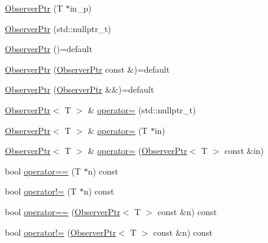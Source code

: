 \begin{DoxyCompactItemize}
\item 
\hyperlink{structvt_1_1util_1_1ptr_1_1_observer_ptr_a6130f8e36c57c992ab5fc8ce954f921b}{Observer\+Ptr} (T $\ast$in\+\_\+p)
\item 
\hyperlink{structvt_1_1util_1_1ptr_1_1_observer_ptr_afa392aae4efef6c10eb8372b19de5008}{Observer\+Ptr} (std\+::nullptr\+\_\+t)
\item 
\hyperlink{structvt_1_1util_1_1ptr_1_1_observer_ptr_a1dfb004e6df35f93847876bdafac2f3b}{Observer\+Ptr} ()=default
\item 
\hyperlink{structvt_1_1util_1_1ptr_1_1_observer_ptr_ac156b77e1a813a2cb9d5d32578dba8ac}{Observer\+Ptr} (\hyperlink{structvt_1_1util_1_1ptr_1_1_observer_ptr}{Observer\+Ptr} const \&)=default
\item 
\hyperlink{structvt_1_1util_1_1ptr_1_1_observer_ptr_abbd144c94f936c6b027508e316270edc}{Observer\+Ptr} (\hyperlink{structvt_1_1util_1_1ptr_1_1_observer_ptr}{Observer\+Ptr} \&\&)=default
\item 
\hyperlink{structvt_1_1util_1_1ptr_1_1_observer_ptr}{Observer\+Ptr}$<$ T $>$ \& \hyperlink{structvt_1_1util_1_1ptr_1_1_observer_ptr_a1e4b2d8b7fa49ddbba59b5d2516b0317}{operator=} (std\+::nullptr\+\_\+t)
\item 
\hyperlink{structvt_1_1util_1_1ptr_1_1_observer_ptr}{Observer\+Ptr}$<$ T $>$ \& \hyperlink{structvt_1_1util_1_1ptr_1_1_observer_ptr_a8134934d20910965a81a9dd65b40ed5a}{operator=} (T $\ast$in)
\item 
\hyperlink{structvt_1_1util_1_1ptr_1_1_observer_ptr}{Observer\+Ptr}$<$ T $>$ \& \hyperlink{structvt_1_1util_1_1ptr_1_1_observer_ptr_ad1095edbab8585f49c0845914e3d2921}{operator=} (\hyperlink{structvt_1_1util_1_1ptr_1_1_observer_ptr}{Observer\+Ptr}$<$ T $>$ const \&in)
\item 
bool \hyperlink{structvt_1_1util_1_1ptr_1_1_observer_ptr_ae7af50331ac75272eee6f6f1d41c01db}{operator==} (T $\ast$n) const
\item 
bool \hyperlink{structvt_1_1util_1_1ptr_1_1_observer_ptr_aeb5dc64d64f5ebd920bfeaa094fa9647}{operator!=} (T $\ast$n) const
\item 
bool \hyperlink{structvt_1_1util_1_1ptr_1_1_observer_ptr_a7b4eb7de1198d4082f5aaaab043ac5d1}{operator==} (\hyperlink{structvt_1_1util_1_1ptr_1_1_observer_ptr}{Observer\+Ptr}$<$ T $>$ const \&n) const
\item 
bool \hyperlink{structvt_1_1util_1_1ptr_1_1_observer_ptr_ab02d0973d758ed1d7e64f05c087180b2}{operator!=} (\hyperlink{structvt_1_1util_1_1ptr_1_1_observer_ptr}{Observer\+Ptr}$<$ T $>$ const \&n) const

\end{DoxyCompactItemize}
